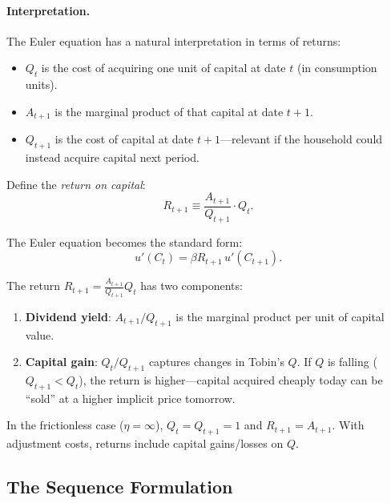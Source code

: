 \paragraph{Interpretation.}
The Euler equation has a natural interpretation in terms of returns:
\begin{itemize}[nosep]
\item $Q_t$ is the cost of acquiring one unit of capital at date $t$ (in consumption units).
\item $A_{t+1}$ is the marginal product of that capital at date $t+1$.
\item $Q_{t+1}$ is the cost of capital at date $t+1$---relevant if the household could instead acquire capital next period.
\end{itemize}

Define the \emph{return on capital}:
\begin{equation}
R_{t+1} \equiv \frac{A_{t+1}}{Q_{t+1}} \cdot Q_t.
\label{eq:ac-T-return}
\end{equation}

The Euler equation becomes the standard form:
\begin{equation}
u'(C_t) = \beta R_{t+1} \, u'(C_{t+1}).
\label{eq:ac-T-euler-standard}
\end{equation}

\begin{calloutimportant}
The return $R_{t+1} = \frac{A_{t+1}}{Q_{t+1}} Q_t$ has two components:
\begin{enumerate}[nosep]
\item \textbf{Dividend yield}: $A_{t+1}/Q_{t+1}$ is the marginal product per unit of capital value.
\item \textbf{Capital gain}: $Q_t/Q_{t+1}$ captures changes in Tobin's $Q$. If $Q$ is falling ($Q_{t+1} < Q_t$), the return is higher---capital acquired cheaply today can be ``sold'' at a higher implicit price tomorrow.
\end{enumerate}

In the frictionless case ($\eta = \infty$), $Q_t = Q_{t+1} = 1$ and $R_{t+1} = A_{t+1}$. With adjustment costs, returns include capital gains/losses on $Q$.
\end{calloutimportant}

\subsection{The Sequence Formulation}
\label{subsec:ac-T-sequence}

